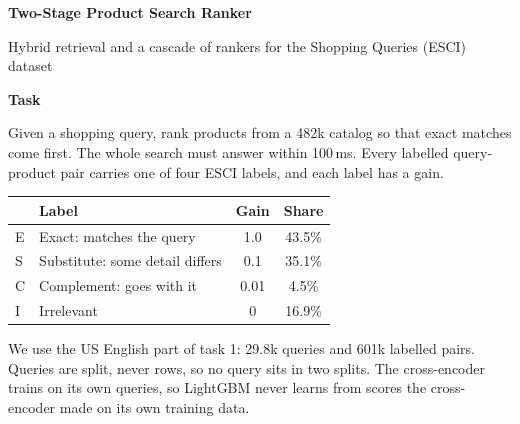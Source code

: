 \documentclass[12pt]{article}
\newlength{\colh}\setlength{\colh}{31cm}
\newcommand{\firsthead}[1]{{\Large\bfseries\color{accent}#1}\par\vspace{2pt}}
\newcommand{\head}[1]{\vspace{10pt plus 1fil}\firsthead{#1}}
\begin{document}
\begin{center}
{\fontsize{40}{48}\selectfont\bfseries\color{accent} Two-Stage Product Search Ranker}\par\vspace{8pt}
{\Large Hybrid retrieval and a cascade of rankers for the Shopping Queries (ESCI) dataset}
\end{center}
\vspace{14pt}

\begin{minipage}[t][\colh][s]{0.31\textwidth}
\firsthead{Task}
Given a shopping query, rank products from a 482k catalog so that exact matches come first.
The whole search must answer within 100\,ms.
Every labelled query-product pair carries one of four ESCI labels, and each label has a gain.

\begin{center}
\begin{tabular}{llcc}
\toprule
 & Label & Gain & Share \\
\midrule
E & Exact: matches the query & 1.0 & 43.5\% \\
S & Substitute: some detail differs & 0.1 & 35.1\% \\
C & Complement: goes with it & 0.01 & 4.5\% \\
I & Irrelevant & 0 & 16.9\% \\
\bottomrule
\end{tabular}
\end{center}

\head{Data}
We use the US English part of task 1: 29.8k queries and 601k labelled pairs.
Queries are split, never rows, so no query sits in two splits.
The cross-encoder trains on its own queries, so LightGBM never learns from scores the cross-encoder made on its own training data.

\begin{center}
\end{center}


\end{minipage}
\end{document}
